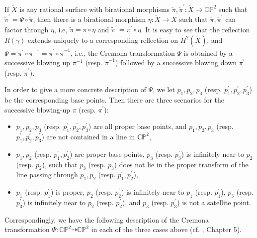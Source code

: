\documentclass[11pt]{amsart}
\theoremstyle{plain}
\numberwithin{theorem}{section}
\theoremstyle{definition}
\newcommand{\C}{{\mathbb C}}
\renewcommand{\P}{{\mathbb P}}
\begin{document}
If $\tilde{X}$ is any rational surface with birational morphisms $\tilde{\pi}, \tilde{\pi}^\prime: \tilde{X}\rightarrow \C\P^2$ such that $\tilde{\pi}^\prime=\Psi\circ \tilde{\pi}$, then there is a birational morphism $\eta: \tilde{X}\rightarrow X$ such that $\tilde{\pi}, \tilde{\pi}^\prime$ can factor through $\eta$, i.e, 
$\tilde{\pi}=\pi\circ \eta$ and $\tilde{\pi}^\prime=\pi^\prime\circ\eta$. It is easy to see 
that the reflection $R(\gamma)$ extends uniquely to a corresponding reflection on $H^2(\tilde{X})$, and 
$\Psi=\pi^\prime\circ \pi^{-1}=\tilde{\pi}^\prime\circ \tilde{\pi}^{-1}$, i.e., the Cremona transformation $\Psi$ is obtained by a successive blowing up $\pi^{-1}$ (resp. $\tilde{\pi}^{-1}$) followed by a successive blowing down 
$\pi^\prime$ (resp. $\tilde{\pi}^{\prime}$).

In order to give a more concrete description of $\Psi$, we let $p_1,p_2,p_3$ (resp. $p_1^\prime,p_2^\prime,p_3^\prime$) be the corresponding base points. Then there are three scenarios for the successive blowing-up $\pi$ (resp. $\pi^\prime$):
\begin{itemize}
\item [{(1)}] $p_1,p_2,p_3$ (resp. $p_1^\prime,p_2^\prime,p_3^\prime$) are all proper base points, and $p_1,p_2,p_3$ (resp. $p_1^\prime,p_2^\prime,p_3^\prime$) are not contained in a line in $\C\P^2$,
\item [{(2)}] $p_1,p_2$  (resp. $p_1^\prime,p_2^\prime$) are proper base points, 
$p_3$ (resp. $p_3^\prime$) is infinitely near to $p_2$  (resp. $p_2^\prime$), such that $p_3$ (resp. $p_3^\prime$)
does not lie in the proper transform of the line passing through  $p_1,p_2$  (resp. $p_1^\prime,p_2^\prime$),
\item [{(3)}] $p_1$  (resp. $p_1^\prime$) is proper, $p_2$  (resp. $p_2^\prime$) is infinitely near 
to $p_1$  (resp. $p_1^\prime$),  $p_3$  (resp. $p_3^\prime$) is infinitely near 
to $p_2$  (resp. $p_2^\prime$), and $p_3$  (resp. $p_3^\prime$) is not a satellite point. 
\end{itemize}

Correspondingly, we have the following description of the Cremona transformation $\Psi: \C\P^2\dashrightarrow \C\P^2$ in each of the three cases above (cf. \cite{Moe}, Chapter 5).

\vspace{1mm}
\end{document}
